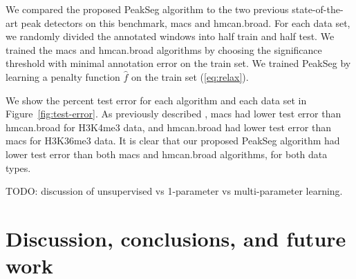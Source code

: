 \documentclass{article}
\begin{document}
We compared the proposed PeakSeg algorithm to the two previous
state-of-the-art peak detectors on this benchmark, macs and
\mbox{hmcan.broad}. For each data set, we randomly divided the
annotated windows into half train and half test. We trained the macs
and hmcan.broad algorithms by choosing the significance threshold with
minimal annotation error on the train set. We trained PeakSeg by
learning a penalty function $\hat f$ on the train set
(\ref{eq:relax}).

We show the percent test error for each algorithm and each data set in
Figure~\ref{fig:test-error}. As previously described
\citep{hocking2014visual}, macs had lower test error than
\mbox{hmcan.broad} for H3K4me3 data, and \mbox{hmcan.broad} had lower
test error than macs for H3K36me3 data. It is clear that our proposed
PeakSeg algorithm had lower test error than both macs and hmcan.broad
algorithms, for both data types.

TODO: discussion of unsupervised vs 1-parameter vs multi-parameter
learning.

%   

\section{Discussion, conclusions, and future work}


\end{document}
